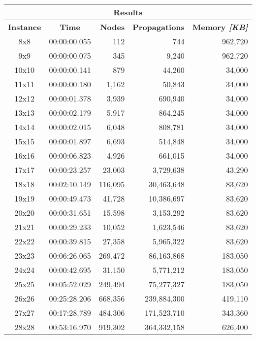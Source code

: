 
\begin{center}
    \begin{tabular}{|c|c|r|r|r|}
        \hline
        \multicolumn{5}{|c|}{\textbf{Results}} \\
        \hline
        \textbf{Instance} & \textbf{Time} & \textbf{Nodes} & \textbf{Propagations} & \textbf{Memory \textit{[KB]}} \\
        
        \hline
		8x8 & 00:00:00.055 & 112 & 744 & 962,720 \\ \hline
		9x9 & 00:00:00.075 & 345 & 9,240 & 962,720 \\ \hline
		10x10 & 00:00:00.141 & 879 & 44,260 & 34,000 \\ \hline
		11x11 & 00:00:00.180 & 1,162 & 50,843 & 34,000 \\ \hline
		12x12 & 00:00:01.378 & 3,939 & 690,940 & 34,000 \\ \hline
		13x13 & 00:00:02.179 & 5,917 & 864,245 & 34,000 \\ \hline
		14x14 & 00:00:02.015 & 6,048 & 808,781 & 34,000 \\ \hline
		15x15 & 00:00:01.897 & 6,693 & 514,848 & 34,000 \\ \hline
		16x16 & 00:00:06.823 & 4,926 & 661,015 & 34,000 \\ \hline
		17x17 & 00:00:23.257 & 23,003 & 3,729,638 & 43,290 \\ \hline
		18x18 & 00:02:10.149 & 116,095 & 30,463,648 & 83,620 \\ \hline
		19x19 & 00:00:49.473 & 41,728 & 10,386,697 & 83,620 \\ \hline
		20x20 & 00:00:31.651 & 15,598 & 3,153,292 & 83,620 \\ \hline
		21x21 & 00:00:29.233 & 10,052 & 1,623,546 & 83,620 \\ \hline
		22x22 & 00:00:39.815 & 27,358 & 5,965,322 & 83,620 \\ \hline
		23x23 & 00:06:26.065 & 269,472 & 86,163,868 & 183,050 \\ \hline
		24x24 & 00:00:42.695 & 31,150 & 5,771,212 & 183,050 \\ \hline
		25x25 & 00:05:52.029 & 249,494 & 75,277,327 & 183,050 \\ \hline
		26x26 & 00:25:28.206 & 668,356 & 239,884,300 & 419,110 \\ \hline
		27x27 & 00:17:28.789 & 484,306 & 171,523,710 & 343,360 \\ \hline
		28x28 & 00:53:16.970 & 919,302 & 364,332,158 & 626,400 \\ \hline

\end{tabular}
\end{center}
